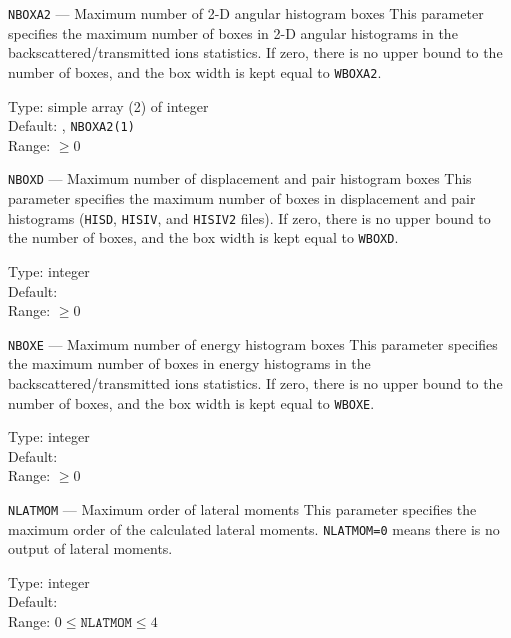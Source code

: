 \begin{keydescription}{\texttt{NBOXA2} --- Maximum number of 2-D angular histogram boxes}
%
  This parameter specifies the maximum number of boxes in 2-D angular histograms
  in the backscattered/transmitted ions statistics.  If
  zero, there is no upper bound to the number of boxes, and the box width is
  kept equal to \texttt{WBOXA2}.
  \begin{keytab}
    Type:    \> simple array (2) of integer \\
    Default: , \texttt{NBOXA2(1)} \\
    Range:   \> $\ge 0$
  \end{keytab}
\end{keydescription}

\begin{keydescription}{\texttt{NBOXD} --- Maximum number of displacement and pair histogram 
    boxes}
%
  This parameter specifies the maximum number of boxes in displacement and pair histograms 
  (\texttt{HISD}, \texttt{HISIV}, and \texttt{HISIV2} files). If zero, there is
  no upper bound to the number of boxes, and the box width is kept equal to
  \texttt{WBOXD}. 
  \begin{keytab}
    Type:    \> integer \\
    Default:  \\
    Range:   \> $\ge 0$
  \end{keytab}
\end{keydescription}

\begin{keydescription}{\texttt{NBOXE} --- Maximum number of energy histogram boxes}
%
  This parameter specifies the maximum number of boxes in energy histograms in the 
  backscattered/transmitted ions statistics. If zero, there is no upper bound to
  the number of boxes, and the box width is kept equal to \texttt{WBOXE}.
  \begin{keytab}
    Type:    \> integer \\
    Default:  \\
    Range:   \> $\ge 0$
  \end{keytab}
\end{keydescription}

\begin{keydescription}{\texttt{NLATMOM} --- Maximum order of lateral moments}
%
  This parameter specifies the maximum order of the calculated lateral moments.
  \texttt{NLATMOM=0} means there is no output of lateral moments. 
  \begin{keytab}
    Type:    \> integer \\
    Default:  \\
    Range:   \> $0 \le \texttt{NLATMOM} \le 4$
  \end{keytab}
\end{keydescription}

